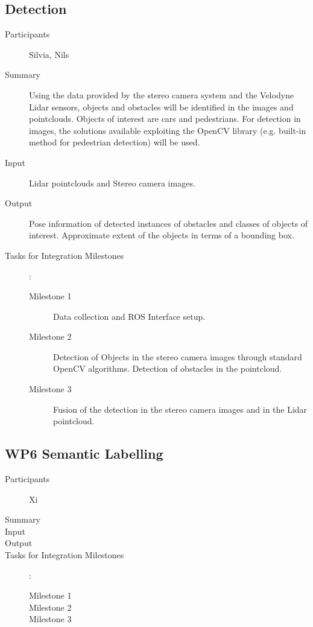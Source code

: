 \documentclass[11pt,a4paper]{article}
\begin{document}
\subsection{Detection} %

\begin{description}
\item[Participants] Silvia, Nils
\item[Summary]
	Using the data provided by the stereo camera system and the Velodyne Lidar sensors, objects and obstacles will be identified in the images and pointclouds. Objects of interest are cars and pedestrians. For detection in images, the solutions available exploiting the OpenCV library (e.g. built-in method for pedestrian detection) will be used. 
\item[Input]
	Lidar pointclouds and Stereo camera images.
\item[Output]
	Pose information of detected instances of obstacles and classes of objects of interest. Approximate extent of the objects in terms of a bounding box.
\item[Tasks for Integration Milestones]:\
	\begin{description}
		\item[Milestone 1]
			Data collection and ROS Interface setup.
		\item[Milestone 2]
			Detection of Objects in the stereo camera images through standard OpenCV algorithms. Detection of obstacles in the pointcloud.
		\item[Milestone 3]
			Fusion of the detection in the stereo camera images and in the Lidar pointcloud.
	\end{description}	 
\end{description}

\subsection{WP6 Semantic Labelling} %

\begin{description}
\item[Participants] Xi
\item[Summary]
\item[Input]
\item[Output]
\item[Tasks for Integration Milestones]:\
	\begin{description}
		\item[Milestone 1]
		\item[Milestone 2]
		\item[Milestone 3] 
	\end{description}	 
\end{description}
\end{document}
